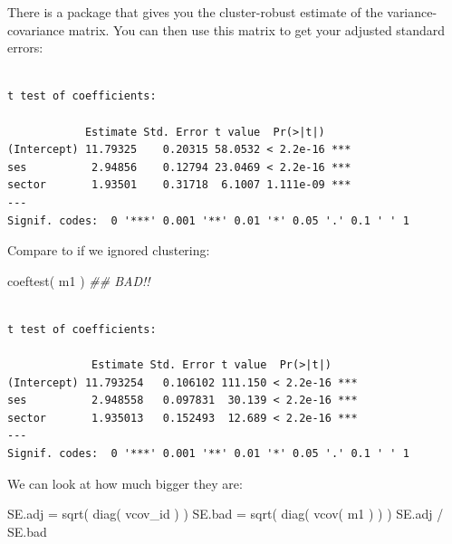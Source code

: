 \documentclass[
  letterpaper,
  DIV=11,
  numbers=noendperiod]{scrreprt}
\newenvironment{Shaded}{}{}
\newcommand{\AttributeTok}[1]{\textcolor[rgb]{0.49,0.56,0.16}{#1}}
\newcommand{\DocumentationTok}[1]{\textcolor[rgb]{0.73,0.13,0.13}{\textit{#1}}}
\newcommand{\FunctionTok}[1]{\textcolor[rgb]{0.02,0.16,0.49}{#1}}
\newcommand{\NormalTok}[1]{#1}
\newcommand{\OtherTok}[1]{\textcolor[rgb]{0.00,0.44,0.13}{#1}}
\newcommand{\SpecialCharTok}[1]{\textcolor[rgb]{0.25,0.44,0.63}{#1}}
\begin{document}
There is a package that gives you the cluster-robust estimate of the
variance-covariance matrix. You can then use this matrix to get your
adjusted standard errors:

\begin{Shaded}
\end{Shaded}

\begin{verbatim}

t test of coefficients:

            Estimate Std. Error t value  Pr(>|t|)    
(Intercept) 11.79325    0.20315 58.0532 < 2.2e-16 ***
ses          2.94856    0.12794 23.0469 < 2.2e-16 ***
sector       1.93501    0.31718  6.1007 1.111e-09 ***
---
Signif. codes:  0 '***' 0.001 '**' 0.01 '*' 0.05 '.' 0.1 ' ' 1
\end{verbatim}

Compare to if we ignored clustering:

\begin{Shaded}
\begin{Highlighting}[]
\FunctionTok{coeftest}\NormalTok{( m1 )  }\DocumentationTok{\#\# BAD!!}
\end{Highlighting}
\end{Shaded}

\begin{verbatim}

t test of coefficients:

             Estimate Std. Error t value  Pr(>|t|)    
(Intercept) 11.793254   0.106102 111.150 < 2.2e-16 ***
ses          2.948558   0.097831  30.139 < 2.2e-16 ***
sector       1.935013   0.152493  12.689 < 2.2e-16 ***
---
Signif. codes:  0 '***' 0.001 '**' 0.01 '*' 0.05 '.' 0.1 ' ' 1
\end{verbatim}

We can look at how much bigger they are:

\begin{Shaded}
\begin{Highlighting}[]
\NormalTok{SE.adj }\OtherTok{=} \FunctionTok{sqrt}\NormalTok{( }\FunctionTok{diag}\NormalTok{( vcov\_id ) )}
\NormalTok{SE.bad }\OtherTok{=} \FunctionTok{sqrt}\NormalTok{( }\FunctionTok{diag}\NormalTok{( }\FunctionTok{vcov}\NormalTok{( m1 ) ) )}
\NormalTok{SE.adj }\SpecialCharTok{/}\NormalTok{ SE.bad}
\end{Highlighting}
\end{Shaded}
\end{document}
